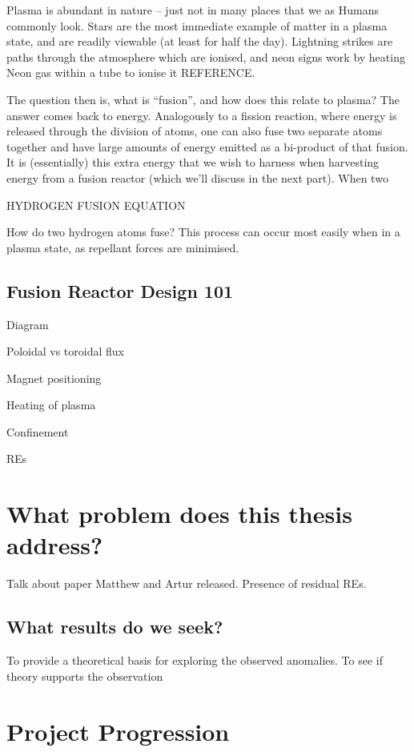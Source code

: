 Plasma is abundant in nature -- just not in many places that we as Humans commonly look. Stars are the most immediate example of matter in a plasma state, 
and are readily viewable (at least for half the day). Lightning strikes are paths through the atmosphere which are ionised, 
and neon signs work by heating Neon gas within a tube to ionise it REFERENCE.

The question then is, what is ``fusion'', and how does this relate to plasma? The answer comes back to energy. Analogously to a fission reaction, 
where energy is released through the division of atoms, one can also fuse two separate atoms together and have large amounts of energy emitted 
as a bi-product of that fusion. It is (essentially) this extra energy that we wish to harness when harvesting energy from a fusion reactor (which we'll 
discuss in the next part). When two 

HYDROGEN FUSION EQUATION

How do two hydrogen atoms fuse? This process can occur most easily when in a plasma state, as repellant forces are minimised.


\subsection{Fusion Reactor Design 101}

Diagram

Poloidal vs toroidal flux

Magnet positioning

Heating of plasma

Confinement

REs

\section{What problem does this thesis address?}

Talk about paper Matthew and Artur released. Presence of residual REs.

\subsection{What results do we seek?}

To provide a theoretical basis for exploring the observed anomalies. 
To see if theory supports the observation

\section{Project Progression}

